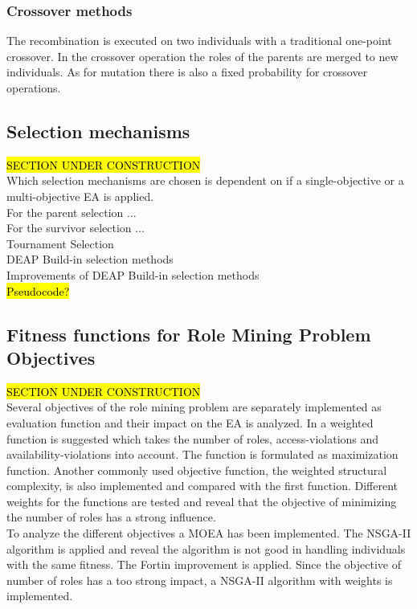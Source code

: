         \subsubsection{Crossover methods}
        The recombination is executed on two individuals with a traditional one-point crossover. In the crossover operation the roles of the parents are merged to new individuals. As for mutation there is also a fixed probability for crossover operations.
        
    \subsection{Selection mechanisms}
    \hl{SECTION UNDER CONSTRUCTION}\\
    Which selection mechanisms are chosen is dependent on if a single-objective or a multi-objective EA is applied.\\
    For the parent selection ...\\
    For the survivor selection ...\\
    Tournament Selection\\
    DEAP Build-in selection methods\\
    Improvements of DEAP Build-in selection methods\\
    \hl{Pseudocode?}
    
    \subsection{Fitness functions for Role Mining Problem Objectives}
    \hl{SECTION UNDER CONSTRUCTION}\\
    Several objectives of the role mining problem are separately implemented as evaluation function and their impact on the EA is analyzed. In \cite{saenko2012design} a weighted function is suggested which takes the number of roles, access-violations and availability-violations into account. The function is formulated as maximization function. Another commonly used objective function, the weighted structural complexity, is also implemented and compared with the first function. Different weights for the functions are tested and reveal that the objective of minimizing the number of roles has a strong influence.\\
    To analyze the different objectives a MOEA has been implemented. The NSGA-II algorithm is applied and reveal the algorithm is not good in handling individuals with the same fitness. The Fortin improvement is applied. Since the objective of number of roles has a too strong impact, a NSGA-II algorithm with weights is implemented.
